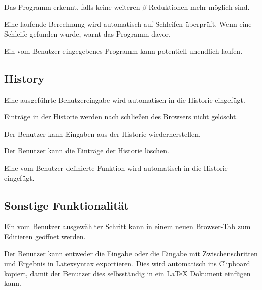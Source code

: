 \documentclass[parskip=full,11pt,twoside]{scrartcl}
\begin{document}
Das Programm erkennt, falls keine weiteren $\beta$-Reduktionen mehr möglich sind.

Eine laufende Berechnung wird automatisch auf Schleifen überprüft. Wenn eine Schleife gefunden wurde, warnt das Programm davor.

Ein vom Benutzer eingegebenes Programm kann potentiell unendlich laufen.




\subsection{History}

Eine ausgeführte Benutzereingabe wird automatisch in die Historie eingefügt.

Einträge in der Historie werden nach schließen des Browsers nicht gelöscht.

Der Benutzer kann Eingaben aus der Historie wiederherstellen.

Der Benutzer kann die Einträge der Historie löschen.

Eine vom Benutzer definierte Funktion wird automatisch in die Historie eingefügt.




\subsection{Sonstige Funktionalität}

Ein vom Benutzer ausgewählter Schritt kann in einem neuen Browser-Tab zum Editieren geöffnet werden.

Der Benutzer kann entweder die Eingabe oder die Eingabe mit Zwischenschritten und Ergebnis in Latexsyntax exportieren. Dies wird automatisch ins Clipboard kopiert, damit der Benutzer dies selbsständig in ein LaTeX Dokument einfügen kann.
\end{document}
